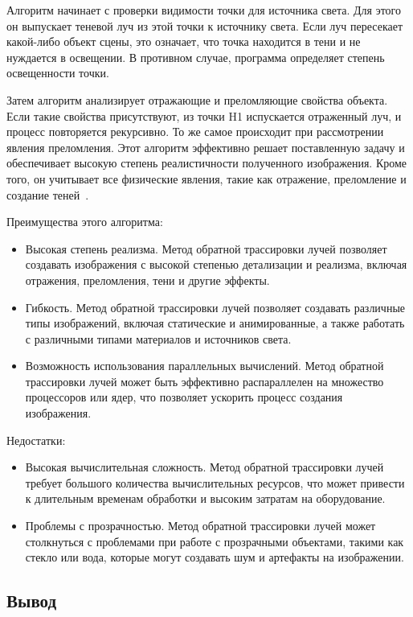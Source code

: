Алгоритм начинает с проверки видимости точки для источника света. 
Для этого он выпускает теневой луч из этой точки к источнику света. 
Если луч пересекает какой-либо объект сцены, это означает, что точка находится в тени и не нуждается в освещении. 
В противном случае, программа определяет степень освещенности точки.

Затем алгоритм анализирует отражающие и преломляющие свойства объекта. Если такие свойства присутствуют, из точки H1 испускается отраженный луч, и процесс повторяется рекурсивно. 
То же самое происходит при рассмотрении явления преломления. 
Этот алгоритм эффективно решает поставленную задачу и обеспечивает высокую степень реалистичности полученного изображения. 
Кроме того, он учитывает все физические явления, такие как отражение, преломление и создание теней~\cite{lectures}.

Преимущества этого алгоритма:
\begin{itemize}
	\item Высокая степень реализма. Метод обратной трассировки лучей позволяет создавать изображения с высокой степенью детализации и реализма, включая отражения, преломления, тени и другие эффекты.
	\item Гибкость. Метод обратной трассировки лучей позволяет создавать различные типы изображений, включая статические и анимированные, а также работать с различными типами материалов и источников света.
	\item Возможность использования параллельных вычислений. Метод обратной трассировки лучей может быть эффективно распараллелен на множество процессоров или ядер, что позволяет ускорить процесс создания изображения.
\end{itemize}

Недостатки:
\begin{itemize}
	\item Высокая вычислительная сложность. Метод обратной трассировки лучей требует большого количества вычислительных ресурсов, что может привести к длительным временам обработки и высоким затратам на оборудование.
	\item Проблемы с прозрачностью. Метод обратной трассировки лучей может столкнуться с проблемами при работе с прозрачными объектами, такими как стекло или вода, которые могут создавать шум и артефакты на изображении.
\end{itemize}

\subsection*{Вывод}

